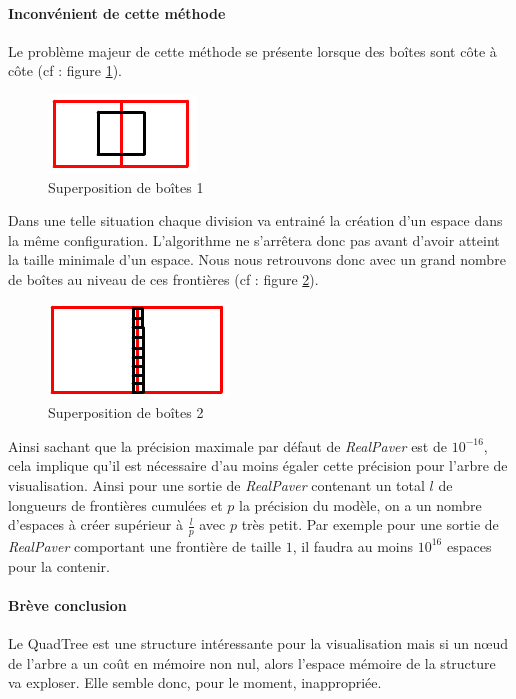 \paragraph{Inconvénient de cette méthode}Le problème majeur de cette méthode se présente lorsque des boîtes sont côte à côte (cf : figure \ref{fig:frontiere}).
\begin{figure}[htbp]
\centering
\includegraphics[scale=0.40]{img/QT7}
\caption{Superposition de boîtes 1}
\label{fig:frontiere}
\end{figure}
Dans une telle situation chaque division va entrainé la création d'un espace dans la même configuration. L'algorithme ne s'arrêtera donc pas avant d'avoir atteint la taille minimale d'un espace. Nous nous retrouvons donc avec un grand nombre de boîtes au niveau de ces \og frontières\fg{} (cf : figure \ref{fig:frontiere2}).
\begin{figure}[htbp]
\centering
\includegraphics[scale=0.40]{img/QT9}
\caption{Superposition de boîtes 2}
\label{fig:frontiere2}
\end{figure}
Ainsi sachant que la précision maximale par défaut de \emph{RealPaver} est de $10^{-16}$, cela implique qu'il est nécessaire d'au moins égaler cette précision pour l'arbre de visualisation. Ainsi pour une sortie de \emph{RealPaver} contenant un total $l$ de longueurs de \og frontières \fg{}  cumulées et $p$ la précision du modèle, on a un nombre d'espaces à créer supérieur à $\frac{l}{p}$ avec $p$ très petit. Par exemple pour une sortie de \emph{RealPaver} comportant une \og frontière \fg{} de taille $1$, il faudra au moins $10^{16}$ espaces pour la contenir. 

\paragraph{Brève conclusion} Le QuadTree est une structure intéressante pour la visualisation mais si un nœud de l'arbre a un coût en mémoire non nul, alors l'espace mémoire de la structure va exploser. Elle semble donc, pour le moment, inappropriée.

